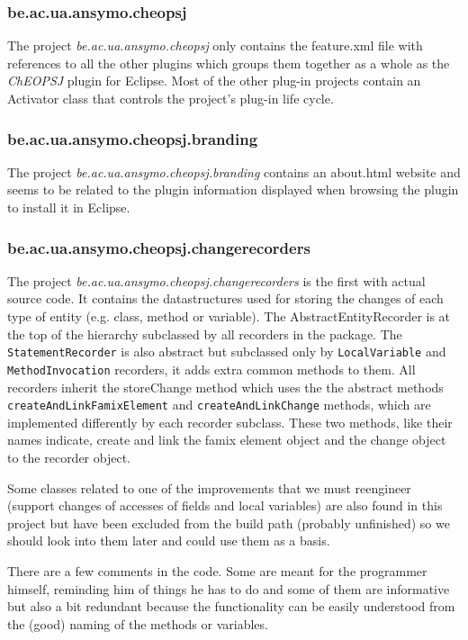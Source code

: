 \documentclass{article}
\begin{document}
\subsubsection{be.ac.ua.ansymo.cheopsj}
The project \emph{be.ac.ua.ansymo.cheopsj} only contains the feature.xml file with references to all the other plugins which groups them together as a whole as the \emph{ChEOPSJ} plugin for Eclipse. Most of the other plug-in projects contain an Activator class that controls the project's plug-in life cycle.

\subsubsection{be.ac.ua.ansymo.cheopsj.branding}
The project \emph{be.ac.ua.ansymo.cheopsj.branding} contains an about.html website and seems to be related to the plugin information displayed when browsing the plugin to install it in Eclipse.

\subsubsection{be.ac.ua.ansymo.cheopsj.changerecorders}
The project \emph{be.ac.ua.ansymo.cheopsj.changerecorders} is the first with actual source code. It contains the datastructures used for storing the changes of each type of entity (e.g. class, method or variable).
The AbstractEntityRecorder is at the top of the hierarchy subclassed by all recorders in the package. The \verb+StatementRecorder+ is also abstract but subclassed only by \verb+LocalVariable+ and \verb+MethodInvocation+ recorders, it adds extra common methods to them. All recorders inherit the storeChange method which uses the the abstract methods \verb+createAndLinkFamixElement+ and \verb+createAndLinkChange+ methods, which are implemented differently by each recorder subclass. These two methods, like their names indicate, create and link the famix element object and the change object to the recorder object.

Some classes related to one of the improvements that we must reengineer (support changes of accesses of fields and local variables) are also found in this project but have been excluded from the build path (probably unfinished) so we should look into them later and could use them as a basis.

There are a few comments in the code. Some are meant for the programmer himself, reminding him of things he has to do and some of them are informative but also a bit redundant because the functionality can be easily understood from the (good) naming of the methods or variables.
\end{document}
